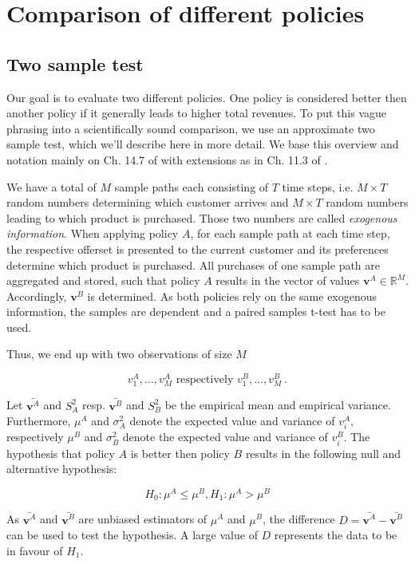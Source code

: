 \chapter{Comparison of different policies}

\section{Two sample test}

Our goal is to evaluate two different policies. One policy is considered better then another policy if it generally leads to higher total revenues. To put this vague phrasing into a scientifically sound comparison, we use an approximate two sample test, which we'll describe here in more detail. We base this overview and notation mainly on Ch. 14.7 of \cite{Bamberg.2011} with extensions as in Ch. 11.3 of \cite{Fahrmeir.2007}.

We have a total of $M$ sample paths each consisting of $T$ time steps, i.e. $M \times T$ random numbers determining which customer arrives and $M \times T$ random numbers leading to which product is purchased. Those two numbers are called \textit{exogenous information}. When applying policy $A$, for each sample path at each time step, the respective offerset is presented to the current customer and its preferences determine which product is purchased. All purchases of one sample path are aggregated and stored, such that policy $A$ results in the vector of values $\mathbf{v}^A \in \mathbb{R}^M$. Accordingly, $\mathbf{v}^B$ is determined. As both policies rely on the same exogenous information, the samples are dependent and a paired samples t-test has to be used.

Thus, we end up with two observations of size $M$ 

$$v^A_1, \dots, v^A_M \text{ respectively } v^B_1, \dots, v^B_M~.$$

Let $\bar{\mathbf{v}^A}$ and $S_A^2$ resp. $\bar{\mathbf{v}^B}$ and $S_B^2$ be the empirical mean and empirical variance. Furthermore, $\mu^A$ and $\sigma_A^2$ denote the expected value and variance of $v^A_i$, respectively $\mu^B$ and $\sigma_B^2$ denote the expected value and variance of $v^B_i$. The hypothesis that policy $A$ is better then policy $B$ results in the following null and alternative hypothesis:

$$H_0: \mu^A \leq \mu^B, H_1: \mu^A > \mu^B$$

As $\bar{\mathbf{v}^A}$ and $\bar{\mathbf{v}^B}$ are unbiased estimators of $\mu^A$ and $\mu^B$, the difference $D = \bar{\mathbf{v}^A} - \bar{\mathbf{v}^B}$ can be used to test the hypothesis. A large value of $D$ represents the data to be in favour of $H_1$. 

